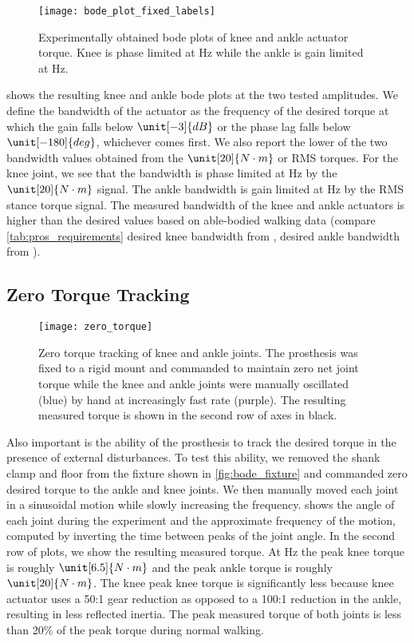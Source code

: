 \begin{figure}[htb]
    \centering 
    \texttt{[image: bode\_plot\_fixed\_labels]}
    \caption{Experimentally obtained bode plots of knee and ankle actuator
    torque. Knee is phase limited at \unit[24]{Hz} while the ankle is gain
    limited at \unit[7]{Hz}.}\label{fig:pros_eval_bode_plots}
\end{figure}
 shows the resulting knee and ankle bode plots at
the two tested amplitudes. We define the bandwidth of the actuator as the
frequency of the desired torque at which the gain falls below $\unit[-3]{dB}$ or
the phase lag falls below $\unit[-180]{deg}$, whichever comes first. We also
report the lower of the two bandwidth values obtained from the $\unit[20]{N
\cdot m}$ or RMS torques. For the knee joint, we see that the bandwidth is phase
limited at \unit[24]{Hz} by the $\unit[20]{N \cdot m}$ signal. The ankle
bandwidth is gain limited at \unit[7]{Hz} by the RMS stance torque signal. The
measured bandwidth of the knee and ankle actuators is higher than the desired
values based on able-bodied walking data (compare \cref{tab:pros_requirements}
desired knee bandwidth from \citep{sergi2012design}, desired ankle bandwidth
from \citet{au2008powered}).

\subsection{Zero Torque Tracking}
\begin{figure}[htb]
    \centering 
    \texttt{[image: zero\_torque]}
    \caption{Zero torque tracking of knee and ankle joints. The prosthesis was
    fixed to a rigid mount and commanded to maintain zero net joint torque while
    the knee and ankle joints were manually oscillated (blue) by hand at
    increasingly fast rate (purple). The resulting measured torque is shown in
    the second row of axes in black.}\label{fig:pros_eval_zero_torque}
\end{figure}
Also important is the ability of the prosthesis to track the desired torque in
the presence of external disturbances. To test this ability, we removed the
shank clamp and floor from the fixture shown in \cref{fig:bode_fixture} and
commanded zero desired torque to the ankle and knee joints. We then manually
moved each joint in a sinusoidal motion while slowly increasing the frequency.
 shows the angle of each joint during the
experiment and the approximate frequency of the motion, computed by inverting
the time between peaks of the joint angle. In the second row of plots, we show
the resulting measured torque. At \unit[3]{Hz} the peak knee torque is roughly
$\unit[6.5]{N \cdot m}$ and the peak ankle torque is roughly $\unit[20]{N \cdot
m}$. The knee peak knee torque is significantly less because knee actuator uses
a 50:1 gear reduction as opposed to a 100:1 reduction in the ankle, resulting in
less reflected inertia. The peak measured torque of both joints is less than
20\% of the peak torque during normal walking.

